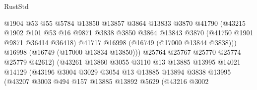 \begin{lexlean}{RustStd}
\begin{coremodule}
                                    @1904
                                    @53
                                    @55
                                    @5784
                                    @13850
                                    @13857
                                    @3864
                                    @13833
                                    @3870
                                    @41790
                                    (@43215
                                      @1902
                                      @101
                                      @53
                                      @16
                                      @9871
                                      @3838
                                      @3850
                                      @3864
                                      @13843
                                      @3870
                                      (@41750 @1901 @9871 @36414 @36418)
                                      @41717
                                      @16998
                                      (@16749 (@17000 @13844 @3838)))
                                    @16998
                                    (@16749 (@17000 @13834 @13850)))
                                  @25764
                                  @25767
                                  @25770
                                  @25774
                                  @25779
                                  @42612)
                                (@43261
                                  @13860
                                  @3055
                                  @3110
                                  @13
                                  @13885
                                  @13995
                                  @14021
                                  @14129
                                  (@43196
                                    @3004
                                    @3029
                                    @3054
                                    @13
                                    @13885
                                    @13894
                                    @3838
                                    @13995
                                    (@43207
                                      @3003
                                      @494
                                      @157
                                      @13885
                                      @13892
                                      @5629
                                      (@43216
                                        @3002

\end{coremodule}
\end{lexlean}
